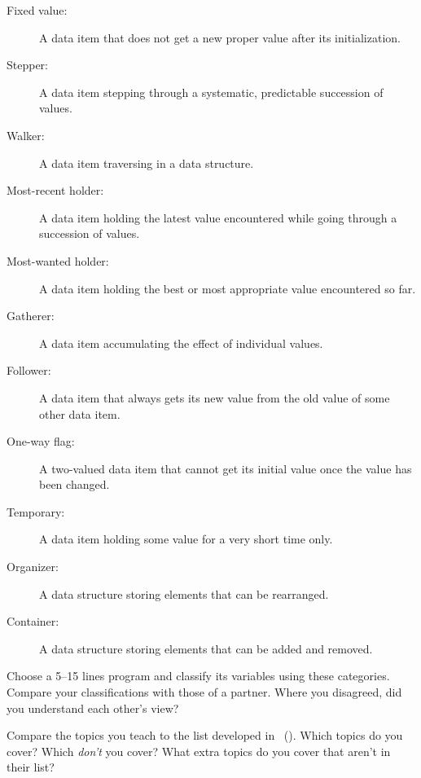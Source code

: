 \begin{description}

\item[Fixed value:]
  A data item that does not get a new proper value after its initialization.

\item[Stepper:]
  A data item stepping through a systematic, predictable succession of values.

\item[Walker:]
  A data item traversing in a data structure.

\item[Most-recent holder:]
  A data item holding the latest value encountered
  while going through a succession of values.

\item[Most-wanted holder:]
  A data item holding the best or most appropriate value encountered so far.

\item[Gatherer:]
  A data item accumulating the effect of individual values.

\item[Follower:]
  A data item that always gets its new value from the old value of some other data item.

\item[One-way flag:]
  A two-valued data item that cannot get its initial value once the value has been changed.

\item[Temporary:]
  A data item holding some value for a very short time only.

\item[Organizer:]
  A data structure storing elements that can be rearranged.

\item[Container:]
  A data structure storing elements that can be added and removed.

\end{description}

Choose a 5--15 lines program and classify its variables using these categories.
Compare your classifications with those of a partner.
Where you disagreed,
did you understand each other's view?


Compare the topics you teach to the list developed in~\cite{Luxt2017} ().
Which topics do you cover?
Which \emph{don't} you cover?
What extra topics do you cover that aren't in their list?

